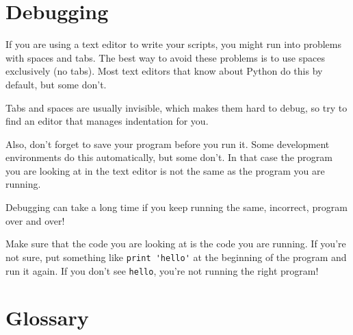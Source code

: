 \section{Debugging}
\label{editor}

If you are using a text editor to write your scripts, you might
run into problems with spaces and tabs.  The best way to avoid
these problems is to use spaces exclusively (no tabs).  Most text
editors that know about Python do this by default, but some
don't.


Tabs and spaces are usually invisible, which makes them
hard to debug, so try to find an editor that manages indentation
for you.

Also, don't forget to save your program before you run it.  Some
development environments do this automatically, but some don't.
In that case the program you are looking at in the text editor
is not the same as the program you are running.

Debugging can take a long time if you keep running the same,
incorrect, program over and over!

Make sure that the code you are looking at is the code you are running.
If you're not sure, put something like \verb"print 'hello'" at the
beginning of the program and run it again.  If you don't see
\verb"hello", you're not running the right program!




\section{Glossary}

